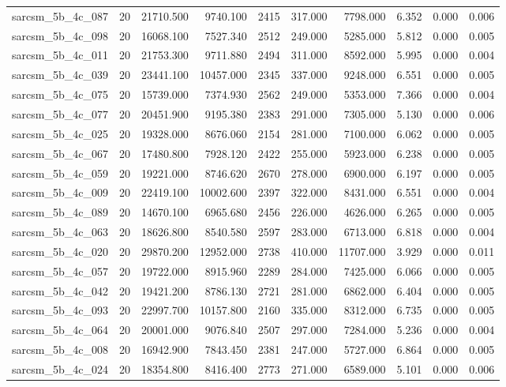 \begin{tabular}{lrrrrrrrrr}
sarcsm\_5b\_4c\_087 & 20 & 21710.500 & 9740.100 & 2415 & 317.000 & 7798.000 & 6.352 & 0.000 & 0.006 \\
sarcsm\_5b\_4c\_098 & 20 & 16068.100 & 7527.340 & 2512 & 249.000 & 5285.000 & 5.812 & 0.000 & 0.005 \\
sarcsm\_5b\_4c\_011 & 20 & 21753.300 & 9711.880 & 2494 & 311.000 & 8592.000 & 5.995 & 0.000 & 0.004 \\
sarcsm\_5b\_4c\_039 & 20 & 23441.100 & 10457.000 & 2345 & 337.000 & 9248.000 & 6.551 & 0.000 & 0.005 \\
sarcsm\_5b\_4c\_075 & 20 & 15739.000 & 7374.930 & 2562 & 249.000 & 5353.000 & 7.366 & 0.000 & 0.004 \\
sarcsm\_5b\_4c\_077 & 20 & 20451.900 & 9195.380 & 2383 & 291.000 & 7305.000 & 5.130 & 0.000 & 0.006 \\
sarcsm\_5b\_4c\_025 & 20 & 19328.000 & 8676.060 & 2154 & 281.000 & 7100.000 & 6.062 & 0.000 & 0.005 \\
sarcsm\_5b\_4c\_067 & 20 & 17480.800 & 7928.120 & 2422 & 255.000 & 5923.000 & 6.238 & 0.000 & 0.005 \\
sarcsm\_5b\_4c\_059 & 20 & 19221.000 & 8746.620 & 2670 & 278.000 & 6900.000 & 6.197 & 0.000 & 0.005 \\
sarcsm\_5b\_4c\_009 & 20 & 22419.100 & 10002.600 & 2397 & 322.000 & 8431.000 & 6.551 & 0.000 & 0.004 \\
sarcsm\_5b\_4c\_089 & 20 & 14670.100 & 6965.680 & 2456 & 226.000 & 4626.000 & 6.265 & 0.000 & 0.005 \\
sarcsm\_5b\_4c\_063 & 20 & 18626.800 & 8540.580 & 2597 & 283.000 & 6713.000 & 6.818 & 0.000 & 0.004 \\
sarcsm\_5b\_4c\_020 & 20 & 29870.200 & 12952.000 & 2738 & 410.000 & 11707.000 & 3.929 & 0.000 & 0.011 \\
sarcsm\_5b\_4c\_057 & 20 & 19722.000 & 8915.960 & 2289 & 284.000 & 7425.000 & 6.066 & 0.000 & 0.005 \\
sarcsm\_5b\_4c\_042 & 20 & 19421.200 & 8786.130 & 2721 & 281.000 & 6862.000 & 6.404 & 0.000 & 0.005 \\
sarcsm\_5b\_4c\_093 & 20 & 22997.700 & 10157.800 & 2160 & 335.000 & 8312.000 & 6.735 & 0.000 & 0.005 \\
sarcsm\_5b\_4c\_064 & 20 & 20001.000 & 9076.840 & 2507 & 297.000 & 7284.000 & 5.236 & 0.000 & 0.004 \\
sarcsm\_5b\_4c\_008 & 20 & 16942.900 & 7843.450 & 2381 & 247.000 & 5727.000 & 6.864 & 0.000 & 0.005 \\
sarcsm\_5b\_4c\_024 & 20 & 18354.800 & 8416.400 & 2773 & 271.000 & 6589.000 & 5.101 & 0.000 & 0.006 \\

\end{tabular}
